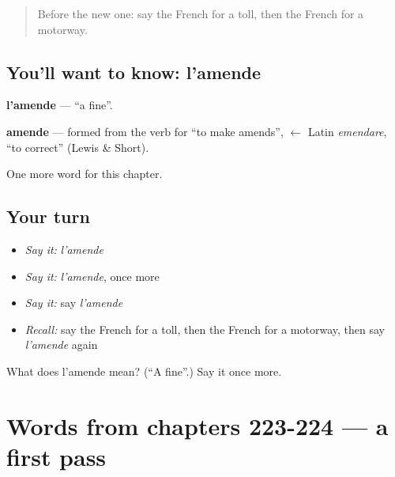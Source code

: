 \label{lesson:FR-C227-amende}



\begin{quote}
Before the new one: say the French for a toll, then the French for a motorway.
\end{quote}

\subsection*{You'll want to know: l'amende}
\textbf{l'amende} — \textquotedblleft{}a fine\textquotedblright{}.

\begin{cousinweb}
\textbf{amende} — formed from the verb for \textquotedblleft{}to make amends\textquotedblright{}, $\leftarrow$ Latin \emph{emendare}, \textquotedblleft{}to correct\textquotedblright{} (Lewis \& Short).
\end{cousinweb}

\begin{grammarlens}[title={What you've built}]
One more word for this chapter.
\end{grammarlens}

\subsection*{Your turn}
\begin{itemize}
\raggedright
  \item \emph{Say it:} \emph{l'amende}
  \item \emph{Say it:} \emph{l'amende}, once more
  \item \emph{Say it:} say \emph{l'amende}
  \item \emph{Recall:} say the French for a toll, then the French for a motorway, then say \emph{l'amende} again
\end{itemize}

\begin{tcolorbox}[breakable,colback=teal!4,colframe=teal!35!black,title={Before you move on}]
What does l'amende mean? (\textquotedblleft{}A fine\textquotedblright{}.) Say it once more.
\end{tcolorbox}
\section[(dialogue)]{Words from chapters 223-224 — a first pass}

\label{lesson:FR-R227-first-pass-words-from-chapters-223-224}




